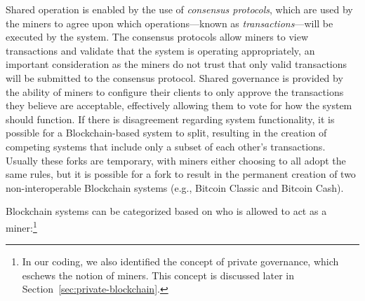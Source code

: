 Shared operation is enabled by the use of \emph{consensus protocols}, which are used by the miners to agree upon which operations---known as \emph{transactions}---will be executed by the system.
The consensus protocols allow miners to view transactions and validate that the system is operating appropriately, an important consideration as the miners do not trust that only valid transactions will be submitted to the consensus protocol.
Shared governance is provided by the ability of miners to configure their clients to only approve the transactions they believe are acceptable, effectively allowing them to vote for how the system should function.
If there is disagreement regarding system functionality, it is possible for a Blockchain-based system to split, resulting in the creation of competing systems that include only a subset of each other's transactions.
Usually these forks are temporary, with miners either choosing to all adopt the same rules, but it is possible for a fork to result in the permanent creation of two non-interoperable Blockchain systems (e.g., Bitcoin Classic and Bitcoin Cash).


Blockchain systems can be categorized based on who is allowed to act as a miner:\footnote{In our coding, we also identified the concept of private governance, which eschews the notion of miners. This concept is discussed later in Section~\ref{sec:private-blockchain}.}

